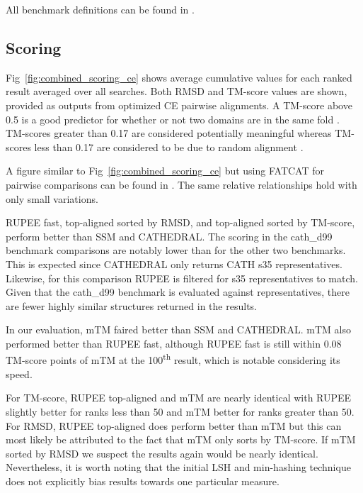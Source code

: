 \documentclass[10pt,letterpaper]{article}
\renewcommand{\figurename}{Fig}
\begin{document}
All benchmark definitions can be found in . 

\subsection*{Scoring}

\figurename~\ref{fig:combined_scoring_ce} shows average cumulative values for each ranked result averaged over all searches.
Both RMSD and TM-score values are shown, provided as outputs from optimized CE pairwise alignments. 
A TM-score above 0.5 is a good predictor for whether or not two domains are in the same fold \cite{Xu2010}.
TM-scores greater than 0.17 are considered potentially meaningful whereas TM-scores less than 0.17 are considered to be due to random alignment \cite{Zhang2004}.

\begin{figure*}[!h]
\caption{Scoring from CE pairwise alignments for RUPEE fast, RUPEE top-aligned sorted by TM-score, and RUPEE top-aligned sorted by RMSD}
\label{fig:combined_scoring_ce}
\end{figure*}

A figure similar to \figurename~\ref{fig:combined_scoring_ce} but using FATCAT for pairwise comparisons can be found in . 
The same relative relationships hold with only small variations. 

RUPEE fast, top-aligned sorted by RMSD, and top-aligned sorted by TM-score, perform better than SSM and CATHEDRAL.
The scoring in the cath\_d99 benchmark comparisons are notably lower than for the other two benchmarks. 
This is expected since CATHEDRAL only returns CATH s35 representatives.
Likewise, for this comparison RUPEE is filtered for s35 representatives to match. 
Given that the cath\_d99 benchmark is evaluated against representatives, there are fewer highly similar structures returned in the results. 

In our evaluation, mTM faired better than SSM and CATHEDRAL. 
mTM also performed better than RUPEE fast, although RUPEE fast is still within 0.08 TM-score points of mTM at the 100\textsuperscript{th} result, which is notable considering its speed.

For TM-score, RUPEE top-aligned and mTM are nearly identical with RUPEE slightly better for ranks less than 50 and mTM better for ranks greater than 50. 
For RMSD, RUPEE top-aligned does perform better than mTM but this can most likely be attributed to the fact that mTM only sorts by TM-score. 
If mTM sorted by RMSD we suspect the results again would be nearly identical.
Nevertheless, it is worth noting that the initial LSH and min-hashing technique does not explicitly bias results towards one particular measure. 
\end{document}
